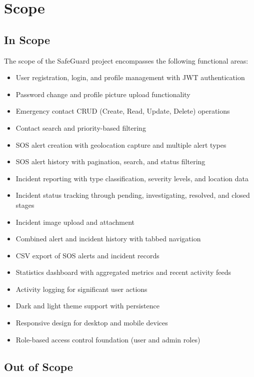 \section{Scope}

\subsection{In Scope}

The scope of the SafeGuard project encompasses the following functional areas:

\begin{itemize}
  \item User registration, login, and profile management with JWT authentication
  \item Password change and profile picture upload functionality
  \item Emergency contact CRUD (Create, Read, Update, Delete) operations
  \item Contact search and priority-based filtering
  \item SOS alert creation with geolocation capture and multiple alert types
  \item SOS alert history with pagination, search, and status filtering
  \item Incident reporting with type classification, severity levels, and location data
  \item Incident status tracking through pending, investigating, resolved, and closed stages
  \item Incident image upload and attachment
  \item Combined alert and incident history with tabbed navigation
  \item CSV export of SOS alerts and incident records
  \item Statistics dashboard with aggregated metrics and recent activity feeds
  \item Activity logging for significant user actions
  \item Dark and light theme support with persistence
  \item Responsive design for desktop and mobile devices
  \item Role-based access control foundation (user and admin roles)
\end{itemize}

\subsection{Out of Scope}

